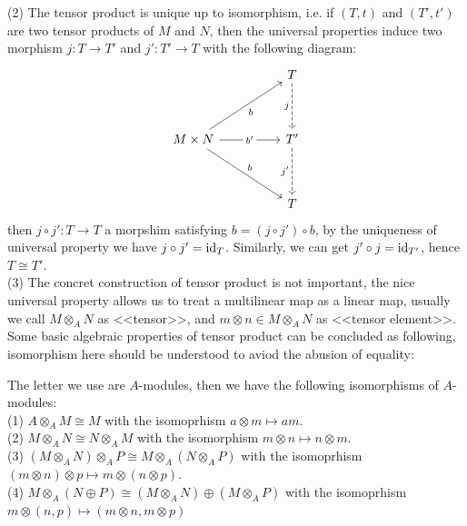     (2) The tensor product is unique up to isomorphism, i.e. if \((T,t)\) and \((T',t')\) are two tensor products of \(M\) and \(N\), then the universal properties induce two morphism \(j:T \to T'\) and \(j': T' \to T\) with the following diagram:
\[\begin{tikzcd}
	&& T \\
	\\
	{M\times N} && {T'} \\
	\\
	&& T
	\arrow["j"', dashed, from=1-3, to=3-3]
	\arrow["b"', from=3-1, to=1-3]
	\arrow["{b'}"{description}, from=3-1, to=3-3]
	\arrow["b", from=3-1, to=5-3]
	\arrow["{j'}"', dashed, from=3-3, to=5-3]
\end{tikzcd}\]
    then \(j\circ j':T \to T\) a morpshim satisfying \(b = (j \circ j') \circ b\), by the uniqueness of universal property we have \(j \circ j' = \operatorname{id}_T\). Similarly, we can get \(j' \circ j = \operatorname{id}_{T'}\), hence \(T \cong T'\).\\

    (3) The concret construction of tensor product is not important, the nice universal property allows us to treat a multilinear map as a linear map, usually we call \(M \otimes_A N\) as <<tensor>>, and \(m \otimes n \in M\otimes_A N\) as <<tensor element>>.\\

Some basic algebraic properties of tensor product can be concluded as following, isomorphism here should be understood to aviod the abusion of equality:
\begin{lemma}
    The letter we use are \(A\)-modules, then we have the following isomorphisms of \(A\)-modules:\\

    (1) \(A \otimes_A M \cong M\) with the isomoprhism \(a \otimes m \mapsto am\).\\

    (2) \(M \otimes_A N \cong N \otimes_A M\) with the isomorphism \(m \otimes n \mapsto n \otimes m\).\\

    (3) \((M \otimes_A N) \otimes_A P \cong M \otimes_A (N \otimes_A P)\) with the isomoprhism \((m \otimes n) \otimes p \mapsto m \otimes (n \otimes p)\).\\

    (4) \(M \otimes_A (N \oplus P) \cong (M \otimes_A N) \oplus (M \otimes_A P)\) with the isomoprhism \(m \otimes (n,p) \mapsto (m\otimes n, m\otimes p)\) \\
\end{lemma}

